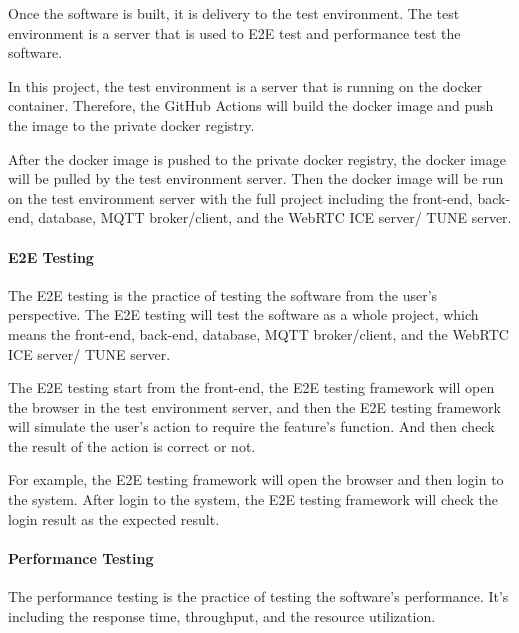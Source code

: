 Once the software is built, it is delivery to the test environment. 
The test environment is a server that is used to E2E test and performance test the software.

In this project, the test environment is a server that is running on the docker container.
Therefore, the GitHub Actions will build the docker image and push the image to the private docker registry.

After the docker image is pushed to the private docker registry, 
the docker image will be pulled by the test environment server.
Then the docker image will be run on the test environment server 
with the full project including the front-end, back-end, database, MQTT broker/client, and the WebRTC ICE server/ TUNE server.

\paragraph{E2E Testing}

The E2E testing is the practice of testing the software from the user's perspective.
The E2E testing will test the software as a whole project, 
which means the front-end, back-end, database, MQTT broker/client, and the WebRTC ICE server/ TUNE server.

The E2E testing start from the front-end, the E2E testing framework will open the browser in the test environment server,
and then the E2E testing framework will simulate the user's action to require the feature's function.
And then check the result of the action is correct or not.

For example, the E2E testing framework will open the browser and then login to the system.
After login to the system, the E2E testing framework will check the login result as the expected result.

\paragraph{Performance Testing}

The performance testing is the practice of testing the software's performance.
It's including the response time, throughput, and the resource utilization.


